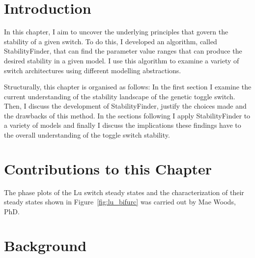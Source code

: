 \section{Introduction}

In this chapter, I aim to uncover the underlying principles that govern the stability of a given switch. To do this, I developed an algorithm, called StabilityFinder, that can find the parameter value ranges that can produce the desired stability in a given model. I use this algorithm to examine a variety of switch architectures using different modelling abstractions.

Structurally, this chapter is organised as follows: In the first section I examine the current understanding of the stability landscape of the genetic toggle switch. Then, I discuss the development of StabilityFinder, justify the choices made and the drawbacks of this method. In the sections following I apply StabilityFinder to a variety of models and finally I discuss the implications these findings have to the overall understanding of the toggle switch stability. 

\section{Contributions to this Chapter}
The phase plots of the Lu switch steady states and the characterization of their steady states shown in Figure~\ref{fig:lu_bifurc} was carried out by Mae Woods, PhD.

\section{Background}

